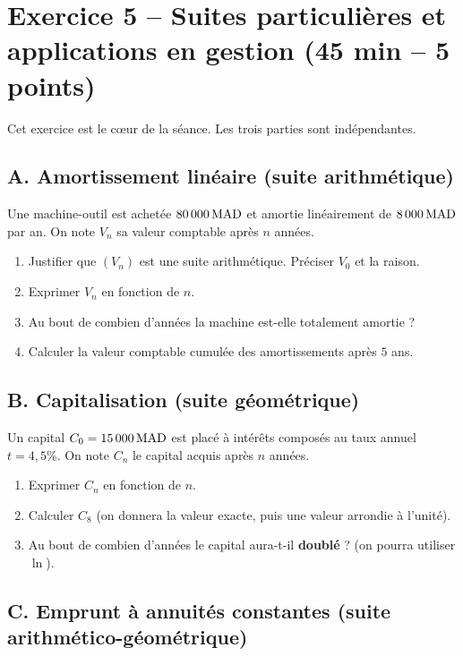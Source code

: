 \documentclass[11pt,a4paper]{article}
\begin{document}
\section*{Exercice 5 -- Suites particulières et applications en gestion \hfill {\normalsize\normalfont (45 min -- 5 points)}}

Cet exercice est le cœur de la séance. Les trois parties sont indépendantes.

\subsection*{A. Amortissement linéaire (suite arithmétique)}

Une machine-outil est achetée $80\,000\,\mathrm{MAD}$ et amortie linéairement de $8\,000\,\mathrm{MAD}$ par an. On note $V_n$ sa valeur comptable après $n$ années.

\begin{enumerate}
  \item Justifier que $(V_n)$ est une suite arithmétique. Préciser $V_0$ et la raison.
  \item Exprimer $V_n$ en fonction de $n$.
  \item Au bout de combien d'années la machine est-elle totalement amortie ?
  \item Calculer la valeur comptable cumulée des amortissements après $5$ ans.
\end{enumerate}

\subsection*{B. Capitalisation (suite géométrique)}

Un capital $C_0 = 15\,000\,\mathrm{MAD}$ est placé à intérêts composés au taux annuel $t=4{,}5\%$. On note $C_n$ le capital acquis après $n$ années.

\begin{enumerate}
  \item Exprimer $C_n$ en fonction de $n$.
  \item Calculer $C_8$ (on donnera la valeur exacte, puis une valeur arrondie à l'unité).
  \item Au bout de combien d'années le capital aura-t-il \textbf{doublé} ? (on pourra utiliser $\ln$).
\end{enumerate}

\subsection*{C. Emprunt à annuités constantes (suite arithmético-géométrique)}
\end{document}
